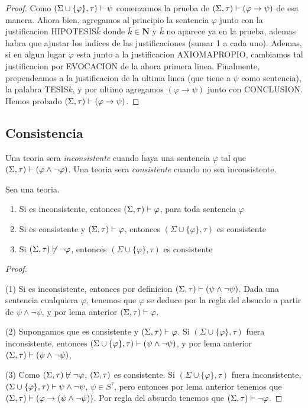 \begin{proof}
    Como $(\Sigma\cup\{\varphi\},\tau)\vdash\psi$ comenzamos la prueba de $(\Sigma,\tau)\vdash(\varphi\rightarrow\psi)$ de esa manera. Ahora bien,
    agregamos al principio la sentencia $\varphi$ junto con la justificacion HIPOTESIS$\bar{k}$ donde $\bar{k} \in \mathbf{N}$ y $\bar{k}$ no aparece ya en la prueba, ademas
    habra que ajustar los indices de las justificaciones (sumar 1 a cada uno).
    Ademas, si en algun lugar $\varphi$ esta junto a la justificacion AXIOMAPROPIO, cambiamos tal justificacion por EVOCACION de la ahora primera linea.
    Finalmente, prependeamos a la justificacion de la ultima linea (que tiene a $\psi$ como sentencia), la palabra TESIS$\bar{k}$, y por ultimo agregamos 
    $(\varphi\rightarrow\psi)$ junto con CONCLUSION. Hemos probado $(\Sigma,\tau)\vdash(\varphi\rightarrow\psi)$.
  \end{proof}

\subsection{Consistencia}
\begin{definition}
  Una teoria \forder sera \emph{inconsistente} cuando haya una sentencia $\varphi$ tal que $(\Sigma,\tau)\vdash(\varphi\land\neg\varphi)$.
  Una teoria \forder sera \emph{consistente} cuando no sea inconsistente.
\end{definition}

\begin{lemma}
  Sea \forder una teoria. \begin{enumerate}
    \item Si \forder es inconsistente, entonces $(\Sigma,\tau)\vdash\varphi$, para toda sentencia $\varphi$
    \item Si \forder es consistente y $(\Sigma,\tau)\vdash\varphi$, entonces $(\Sigma\cup\{\varphi\},\tau)$ es consistente
    \item Si $(\Sigma,\tau)\not\vdash\neg\varphi$, entonces $(\Sigma\cup\{\varphi\},\tau)$ es consistente
  \end{enumerate}
\end{lemma}
\begin{proof}
  $ $

  (1) Si \forder es inconsistente, entonces por definicion $(\Sigma,\tau)\vdash(\psi\land\neg\psi)$. Dada una sentencia cualquiera 
  $\varphi$, tenemos que $\varphi$ se deduce por la regla del absurdo a partir de $\psi\land\neg\psi$, y por lema anterior $(\Sigma,\tau)\vdash\varphi$.

  (2) Supongamos que \forder es consistente y $(\Sigma,\tau)\vdash\varphi$. Si $(\Sigma\cup\{\varphi\},\tau)$ fuera inconsistente,
  entonces $(\Sigma\cup\{\varphi\},\tau)\vdash(\psi\land\neg\psi)$, y por lema anterior $(\Sigma,\tau)\vdash(\psi\land\neg\psi)$, \abs

  (3) Como $(\Sigma,\tau)\not\vdash\neg\varphi$, $(\Sigma,\tau)$ es consistente. Si $(\Sigma \cup \{\varphi\}, \tau)$ fuera inconsistente, $(\Sigma \cup \{\varphi\}, \tau)\vdash\psi\land\neg\psi$, $\psi\in S^\tau$,
  pero entonces por lema anterior tenemos que $(\Sigma,\tau)\vdash(\varphi\rightarrow(\psi\land\neg\psi))$. Por regla del absurdo tenemos que $(\Sigma,\tau)\vdash\neg\varphi$. \abs
\end{proof}

